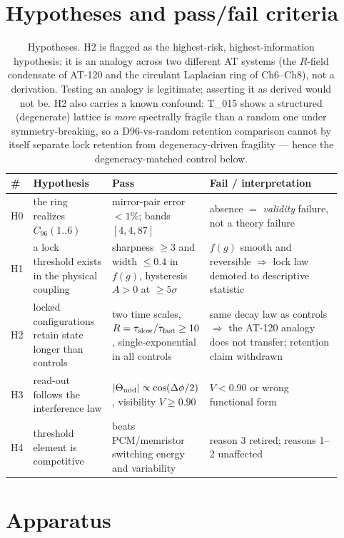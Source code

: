 \documentclass[11pt,a4paper]{article}
\newcommand{\Cninety}{\ensuremath{C_{96}(1..6)}}
\begin{document}
\section{Hypotheses and pass/fail criteria}

\begin{table}[h]
\centering
\small
\begin{tabular}{@{}p{0.05\linewidth}p{0.24\linewidth}p{0.22\linewidth}p{0.41\linewidth}@{}}
\toprule
\# & Hypothesis & Pass & Fail / interpretation \\
\midrule
H0 & the ring realizes \Cninety & mirror-pair error $<1\%$; bands $[4,4,87]$
& absence $=$ \emph{validity} failure, not a theory failure \\
H1 & a lock threshold exists in the physical coupling & sharpness $\ge 3$ and width $\le 0.4$ in
$f(g)$, hysteresis $A>0$ at $\ge5\sigma$ & $f(g)$ smooth and reversible $\Rightarrow$ lock law
demoted to descriptive statistic \\
H2 & locked configurations retain state longer than controls & two time scales,
$R=\tau_{\rm slow}/\tau_{\rm fast}\ge 10$, single-exponential in all controls & same decay law as
controls $\Rightarrow$ the AT-120 analogy does not transfer; retention claim withdrawn \\
H3 & read-out follows the interference law & $|\Theta_{\rm mid}|\propto\cos(\Delta\phi/2)$,
visibility $V\ge0.90$ & $V<0.90$ or wrong functional form \\
H4 & threshold element is competitive & beats PCM/memristor switching energy and variability &
reason 3 retired; reasons 1--2 unaffected \\
\bottomrule
\end{tabular}
\caption{Hypotheses. H2 is flagged as the highest-risk, highest-information hypothesis: it is an
analogy across two different AT systems (the $R$-field condensate of AT-120 and the circulant
Laplacian ring of Ch6--Ch8), not a derivation. Testing an analogy is legitimate; asserting it as
derived would not be. H2 also carries a known confound: T\_015 shows a structured (degenerate)
lattice is \emph{more} spectrally fragile than a random one under symmetry-breaking, so a
D96-vs-random retention comparison cannot by itself separate lock retention from
degeneracy-driven fragility --- hence the degeneracy-matched control below.}
\label{tab:hyp}
\end{table}

\section{Apparatus}
\end{document}
